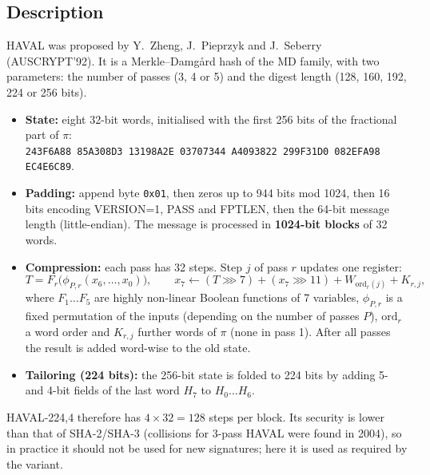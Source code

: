 \documentclass[12pt,a4paper]{article}
\begin{document}
\subsection{Description}
HAVAL was proposed by Y.~Zheng, J.~Pieprzyk and J.~Seberry (AUSCRYPT'92). It is a
Merkle–Damgård hash of the MD family, with two parameters: the number of passes (3, 4 or 5) and
the digest length (128, 160, 192, 224 or 256 bits).
\begin{itemize}
  \item \textbf{State:} eight 32-bit words, initialised with the first 256 bits of the fractional
        part of $\pi$:\\ {\small\texttt{243F6A88 85A308D3 13198A2E 03707344 A4093822 299F31D0 082EFA98 EC4E6C89}}.
  \item \textbf{Padding:} append byte \texttt{0x01}, then zeros up to 944 bits mod 1024, then
        16 bits encoding VERSION=1, PASS and FPTLEN, then the 64-bit message length
        (little-endian). The message is processed in \textbf{1024-bit blocks} of 32 words.
  \item \textbf{Compression:} each pass has 32 steps. Step $j$ of pass $r$ updates one register:
        \[ T = F_r\big(\phi_{P,r}(x_6,\dots,x_0)\big),\qquad
           x_7 \leftarrow (T \ggg 7) + (x_7 \ggg 11) + W_{\mathrm{ord}_r(j)} + K_{r,j}, \]
        where $F_1\dots F_5$ are highly non-linear Boolean functions of 7 variables, $\phi_{P,r}$
        is a fixed permutation of the inputs (depending on the number of passes $P$),
        $\mathrm{ord}_r$ a word order and $K_{r,j}$ further words of $\pi$ (none in pass 1). After
        all passes the result is added word-wise to the old state.
  \item \textbf{Tailoring (224 bits):} the 256-bit state is folded to 224 bits by adding 5- and
        4-bit fields of the last word $H_7$ to $H_0\dots H_6$.
\end{itemize}
HAVAL-224,4 therefore has $4\times32 = 128$ steps per block. Its security is lower than that of
SHA-2/SHA-3 (collisions for 3-pass HAVAL were found in 2004), so in practice it should not be
used for new signatures; here it is used as required by the variant.
\end{document}
